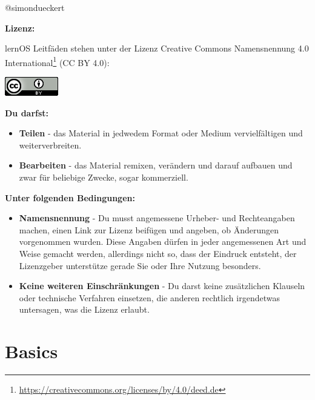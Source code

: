 \documentclass[
  ngerman,
  paper=a4,
,captions=tableheading
]{scrartcl}
\DeclareRobustCommand{\href}[2]{#2\footnote{\url{#1}}}
\providecommand{\tightlist}{%
  \setlength{\itemsep}{0pt}\setlength{\parskip}{0pt}}
\begin{document}
@simondueckert

\textbf{Lizenz:}

lernOS Leitfäden stehen unter der Lizenz
\href{https://creativecommons.org/licenses/by/4.0/deed.de}{Creative
Commons Namensnennung 4.0 International} (CC BY 4.0):

\includegraphics{./tex2pdf.-af94b87e0fdb9aa6/d18286abe9c5f984f58813bfa721e63381b92a7a.png}

\textbf{Du darfst:}

\begin{itemize}
\tightlist
\item
  \textbf{Teilen} - das Material in jedwedem Format oder Medium
  vervielfältigen und weiterverbreiten.
\item
  \textbf{Bearbeiten} - das Material remixen, verändern und darauf
  aufbauen und zwar für beliebige Zwecke, sogar kommerziell.
\end{itemize}

\textbf{Unter folgenden Bedingungen:}

\begin{itemize}
\tightlist
\item
  \textbf{Namensnennung} - Du musst angemessene Urheber- und
  Rechteangaben machen, einen Link zur Lizenz beifügen und angeben, ob
  Änderungen vorgenommen wurden. Diese Angaben dürfen in jeder
  angemessenen Art und Weise gemacht werden, allerdings nicht so, dass
  der Eindruck entsteht, der Lizenzgeber unterstütze gerade Sie oder
  Ihre Nutzung besonders.
\item
  \textbf{Keine weiteren Einschränkungen} - Du darst keine zusätzlichen
  Klauseln oder technische Verfahren einsetzen, die anderen rechtlich
  irgendetwas untersagen, was die Lizenz erlaubt.
\end{itemize}

\hypertarget{basics}{%
\section{Basics}\label{basics}}
\end{document}
